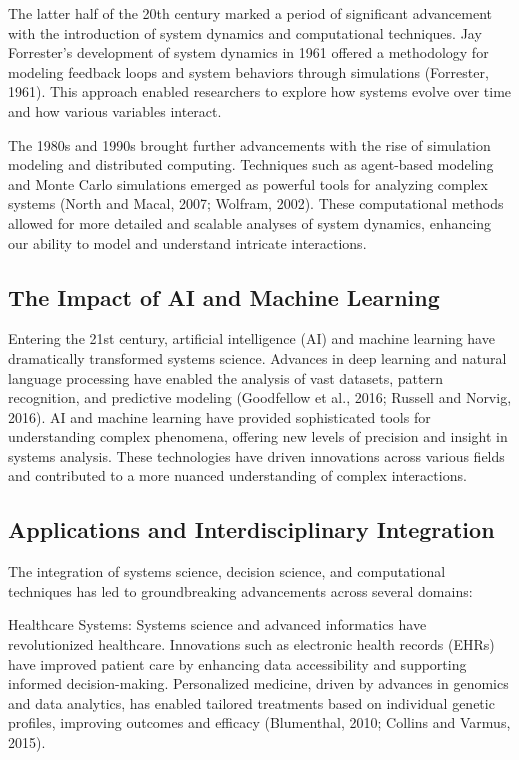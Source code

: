 \documentclass[twocolumn]{article}
\begin{document}
\textcolor{primary}{The latter half of the 20th century marked a period of significant advancement with the introduction of system dynamics and computational techniques. Jay Forrester’s development of system dynamics in 1961 offered a methodology for modeling feedback loops and system behaviors through simulations (Forrester, 1961). This approach enabled researchers to explore how systems evolve over time and how various variables interact.}

\textcolor{secondary}{The 1980s and 1990s brought further advancements with the rise of simulation modeling and distributed computing. Techniques such as agent-based modeling and Monte Carlo simulations emerged as powerful tools for analyzing complex systems (North and Macal, 2007; Wolfram, 2002). These computational methods allowed for more detailed and scalable analyses of system dynamics, enhancing our ability to model and understand intricate interactions.}

\subsection{The Impact of AI and Machine Learning}


\textcolor{primary}{Entering the 21st century, artificial intelligence (AI) and machine learning have dramatically transformed systems science. Advances in deep learning and natural language processing have enabled the analysis of vast datasets, pattern recognition, and predictive modeling (Goodfellow et al., 2016; Russell and Norvig, 2016). AI and machine learning have provided sophisticated tools for understanding complex phenomena, offering new levels of precision and insight in systems analysis. These technologies have driven innovations across various fields and contributed to a more nuanced understanding of complex interactions.}



\subsection{Applications and Interdisciplinary Integration}

\textcolor{primary}{The integration of systems science, decision science, and computational techniques has led to groundbreaking advancements across several domains:}


\textcolor{secondary}{Healthcare Systems: Systems science and advanced informatics have revolutionized healthcare. Innovations such as electronic health records (EHRs) have improved patient care by enhancing data accessibility and supporting informed decision-making. Personalized medicine, driven by advances in genomics and data analytics, has enabled tailored treatments based on individual genetic profiles, improving outcomes and efficacy (Blumenthal, 2010; Collins and Varmus, 2015).}
\end{document}
